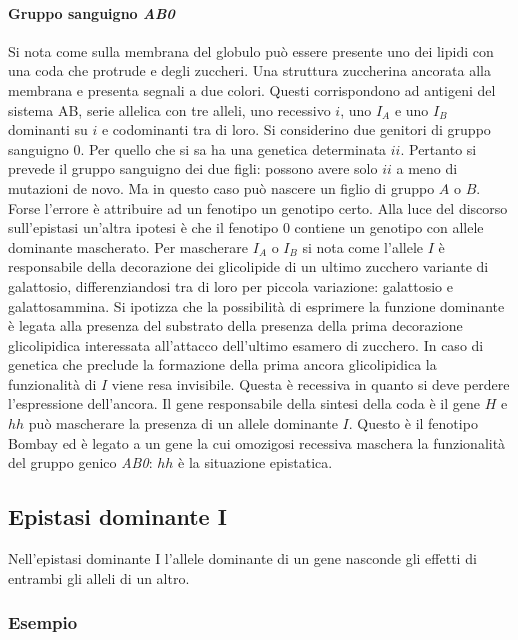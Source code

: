 \paragraph{Gruppo sanguigno \emph{AB0}}
Si nota come sulla membrana del globulo pu\`o essere presente uno dei lipidi con una coda che protrude e degli zuccheri. Una struttura zuccherina ancorata alla membrana e presenta
segnali a due colori. Questi corrispondono ad antigeni del sistema AB, serie allelica con tre alleli, uno recessivo $i$, uno $I_A$ e uno $I_B$ dominanti su $i$ e codominanti tra di 
loro. Si considerino due genitori di gruppo sanguigno $0$. Per quello che si sa ha una genetica determinata $ii$. Pertanto si prevede il gruppo sanguigno dei due figli: possono
avere solo $ii$ a meno di mutazioni de novo. Ma in questo caso pu\`o nascere un figlio di gruppo $A$ o $B$. Forse l'errore \`e attribuire ad un fenotipo un genotipo certo. Alla luce
del discorso sull'epistasi un'altra ipotesi \`e che il fenotipo $0$ contiene un genotipo con allele dominante mascherato. Per mascherare $I_A$ o $I_B$ si nota come l'allele $I$ \`e
responsabile della decorazione dei glicolipide di un ultimo zucchero variante di galattosio, differenziandosi tra di loro per piccola variazione: galattosio e galattosammina. Si 
ipotizza che la possibilit\`a di esprimere la funzione dominante \`e legata alla presenza del substrato della presenza della prima decorazione glicolipidica interessata all'attacco
dell'ultimo esamero di zucchero. In caso di genetica che preclude la formazione della prima ancora glicolipidica la funzionalit\`a di $I$ viene resa invisibile. Questa \`e recessiva
in quanto si deve perdere l'espressione dell'ancora. Il gene responsabile della sintesi della coda \`e il gene $H$ e $hh$ pu\`o mascherare la presenza di un allele dominante $I$. 
Questo \`e il fenotipo Bombay ed \`e legato a un gene la cui omozigosi recessiva maschera la funzionalit\`a del gruppo genico \emph{AB0}: $hh$ \`e la situazione epistatica. 

\subsection{Epistasi dominante I}
Nell'epistasi dominante I l'allele dominante di un gene nasconde gli effetti di entrambi gli alleli di un altro.
\subsubsection{Esempio}
